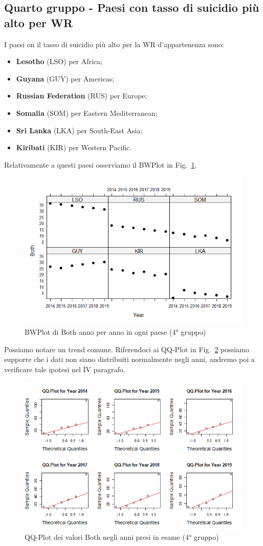 \documentclass[conference]{IEEEtran}
\begin{document}
\subsection{Quarto gruppo - Paesi con tasso di suicidio più alto per WR}

I paesi on il tasso di suicidio più alto per la
WR d'appartenenza sono:
\begin{itemize}
    \item \textbf{Lesotho} (LSO) per Africa;
    \item \textbf{Guyana} (GUY) per Americas;
    \item \textbf{Russian Federation} (RUS) per Europe;
    \item \textbf{Somalia} (SOM) per Eastern Mediterranean;
    \item \textbf{Sri Lanka} (LKA) per South-East Asia;
    \item \textbf{Kiribati} (KIR) per Western Pacific. 
\end{itemize}
Relativamente a questi paesi osserviamo il BWPlot in Fig.~\ref{11fourthgroup}.
\begin{figure}[htbp]
    \centerline{\includegraphics[width=.5\textwidth]{img/11 - Fourthgroup.png}}
    \caption{BWPlot di Both anno per anno in ogni paese (4° gruppo)}
    \label{11fourthgroup}
\end{figure}
Possiamo notare un trend comune.
Riferendoci ai QQ-Plot in Fig.~\ref{12fourthqq} possiamo supporre che i dati non siano
distribuiti normalmente negli anni, andremo poi a verificare tale ipotesi nel IV paragrafo.
\begin{figure}[htbp]
    \centerline{\includegraphics[width=.5\textwidth]{img/12 - Fourthqq.png}}
    \caption{QQ-Plot dei valori Both negli anni presi in esame (4° gruppo)}
    \label{12fourthqq}
\end{figure}
\end{document}

